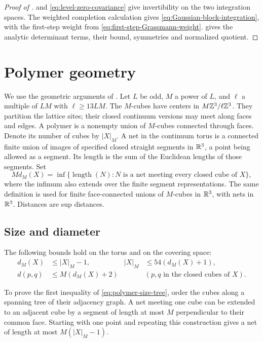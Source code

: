 \begin{proof}[Proof of ]
 and
\eqref{eq:level-zero-covariance} give invertibility on the two
integration spaces. The weighted completion calculation gives
\eqref{eq:Gaussian-block-integration}, with the first-step weight from
\eqref{eq:first-step-Grassmann-weight}.
 gives the analytic determinant
terms, their bound, symmetries and normalized quotient.
\end{proof}


\appendix
\section{Polymer geometry}\label{app:polymer-geometry}

We use the geometric arguments of \cite[Appendix~A]{QED3Manuscript}.
Let $L$ be odd, $M$ a power of $L$, and $\ell$ a multiple of $LM$
with $\ell\ge13LM$. The $M$-cubes have centers in
$M\mathbb Z^3/\ell\mathbb Z^3$. They partition the lattice sites; their closed
continuum versions may meet along faces and edges. A polymer is a
nonempty union of $M$-cubes connected through faces. Denote its number
of cubes by $|X|_M$. A net in the continuum torus is a connected
finite union of images of specified closed straight segments
in $\mathbb R^3$, a point being allowed as a segment.
Its length is the sum of the Euclidean lengths of those segments.
Set
\[
 Md_M(X)=\inf\{\operatorname{length}(N):N
             \text{ is a net meeting every closed cube of }X\},
\]
where the infimum also extends over the finite segment representations.
The same definition is used for finite face-connected unions of
$M$-cubes in $\mathbb R^3$, with nets in $\mathbb R^3$. Distances are sup distances.


\subsection{Size and diameter}
The following bounds hold on the torus and on the covering space:
\begin{align}
 d_M(X)&\le |X|_M-1,&
 |X|_M&\le54(d_M(X)+1),\label{eq:polymer-size-tree}\\
 d(p,q)&\le M(d_M(X)+2)
       &&(p,q\text{ in the closed cubes of }X).
                                  \label{eq:polymer-diameter}
\end{align}

To prove the first inequality of \eqref{eq:polymer-size-tree}, order
the cubes along a spanning tree of their adjacency graph. A net
meeting one cube can be extended to an adjacent cube by a segment of
length at most $M$ perpendicular to their common face. Starting with
one point and repeating this construction gives a net of length at
most $M(|X|_M-1)$.

